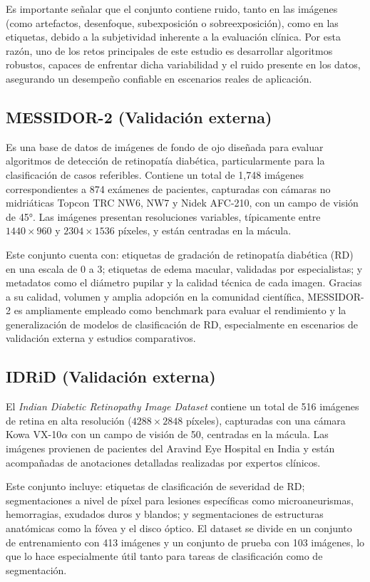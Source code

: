 Es importante señalar que el conjunto contiene ruido, tanto en las imágenes (como artefactos, desenfoque, subexposición o sobreexposición), como en las etiquetas, debido a la subjetividad inherente a la evaluación clínica. Por esta razón, uno de los retos principales de este estudio es desarrollar algoritmos robustos, capaces de enfrentar dicha variabilidad y el ruido presente en los datos, asegurando un desempeño confiable en escenarios reales de aplicación.

\subsection{MESSIDOR-2 (Validación externa)}

Es una base de datos de imágenes de fondo de ojo diseñada para evaluar algoritmos de detección de retinopatía diabética, particularmente para la clasificación de casos referibles. Contiene un total de 1,748 imágenes correspondientes a 874 exámenes de pacientes, capturadas con cámaras no midriáticas Topcon TRC NW6, NW7 y Nidek AFC-210, con un campo de visión de 45°. Las imágenes presentan resoluciones variables, típicamente entre $1440 \times 960$ y $2304 \times 1536$ píxeles, y están centradas en la mácula.

Este conjunto cuenta con: etiquetas de gradación de retinopatía diabética (RD) en una escala de 0 a 3; etiquetas de edema macular, validadas por especialistas; y metadatos como el diámetro pupilar y la calidad técnica de cada imagen. Gracias a su calidad, volumen y amplia adopción en la comunidad científica, MESSIDOR-2 es ampliamente empleado como benchmark para evaluar el rendimiento y la generalización de modelos de clasificación de RD, especialmente en escenarios de validación externa y estudios comparativos.

\subsection{IDRiD (Validación externa)}

El \textit{Indian Diabetic Retinopathy Image Dataset} contiene un total de 516 imágenes de retina en alta resolución ($4288 \times 2848$ píxeles), capturadas con una cámara Kowa VX-10$\alpha$ con un campo de visión de 50\textdegree, centradas en la mácula. Las imágenes provienen de pacientes del Aravind Eye Hospital en India y están acompañadas de anotaciones detalladas realizadas por expertos clínicos.

Este conjunto incluye: etiquetas de clasificación de severidad de RD; segmentaciones a nivel de píxel para lesiones específicas como microaneurismas, hemorragias, exudados duros y blandos; y segmentaciones de estructuras anatómicas como la fóvea y el disco óptico. El dataset se divide en un conjunto de entrenamiento con 413 imágenes y un conjunto de prueba con 103 imágenes, lo que lo hace especialmente útil tanto para tareas de clasificación como de segmentación.

